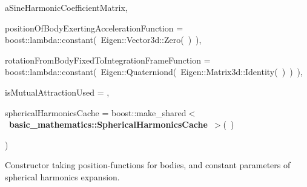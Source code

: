 {\begin{DoxyParamCaption}
\item[{const Eigen\+::\+Matrix\+Xd}]{a\+Sine\+Harmonic\+Coefficient\+Matrix, }
\item[{const {\bf State\+Function}}]{position\+Of\+Body\+Exerting\+Acceleration\+Function = {\ttfamily boost\+:\+:lambda\+:\+:constant(~Eigen\+:\+:Vector3d\+:\+:Zero(~)~)}, }
\item[{const boost\+::function$<$ Eigen\+::\+Quaterniond() $>$}]{rotation\+From\+Body\+Fixed\+To\+Integration\+Frame\+Function = {\ttfamily boost\+:\+:lambda\+:\+:constant(~Eigen\+:\+:Quaterniond(~Eigen\+:\+:Matrix3d\+:\+:Identity(~)~)~)}, }
\item[{const bool}]{is\+Mutual\+Attraction\+Used = {}, }
\item[{boost\+::shared\+\_\+ptr$<$ {\bf basic\+\_\+mathematics\+::\+Spherical\+Harmonics\+Cache} $>$}]{spherical\+Harmonics\+Cache = {\ttfamily boost\+:\+:make\+\_\+shared$<$~{\bf basic\+\_\+mathematics\+::\+Spherical\+Harmonics\+Cache}~$>$(~)}}
\end{DoxyParamCaption}
)\hspace{0.3cm}{\ttfamily [inline]}}\hypertarget{classtudat_1_1gravitation_1_1SphericalHarmonicsGravitationalAccelerationModel_aa63328c068aae8ae8dcc74a055ce865e}{}\label{classtudat_1_1gravitation_1_1SphericalHarmonicsGravitationalAccelerationModel_aa63328c068aae8ae8dcc74a055ce865e}
Constructor taking position-\/functions for bodies, and constant parameters of spherical harmonics expansion.

